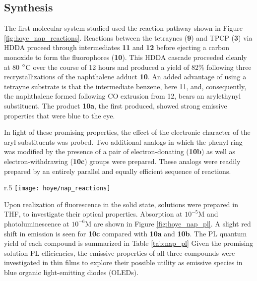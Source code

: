 \documentclass[../thesis.tex]{subfiles}
\begin{document}
\subsection{Synthesis}

The first molecular system studied used the reaction pathway shown in Figure \ref{fig:hoye_nap_reactions}.
Reactions between the tetraynes (\textbf{9}) and TPCP (\textbf{3}) via HDDA proceed through intermediates \textbf{11} and \textbf{12} before ejecting a carbon monoxide to form the fluorophores (\textbf{10}).\supercite{Giguere2015,Cacioppa2016,Pozo2016,Fieser1965,Wittig1958}
This HDDA cascade proceeded cleanly at 80 $\degree$C over the course of 12 hours and produced a yield of 82\% following three recrystallizations of the naphthalene adduct \textbf{10}. 
An added advantage of using a tetrayne substrate is that the intermediate benzene, here 11, and, consequently, the naphthalene formed following CO extrusion from 12, bears an arylethynyl substituent. 
The product \textbf{10a}, the first produced, showed strong emissive properties that were blue to the eye. 


In light of these promising properties, the effect of the electronic character of the aryl substituents was probed. 
Two additional analogs in which the phenyl ring was modified by the presence of a pair of electron-donating (\textbf{10b}) as well as electron-withdrawing (\textbf{10c}) groups were prepared. 
These analogs were readily prepared by an entirely parallel and equally efficient sequence of reactions.


\begin{wrapfigure}{r}{.5\textwidth}
\centering
\texttt{[image: hoye/nap\_reactions]}
\caption{HDDA reactions between \textbf{9} and \textbf{3} proceed through \textbf{11} and \textbf{12}, resulting in the products (\textbf{10}).  Figure reproduced from \textcite{Xu2016}}
\label{fig:hoye_nap_reactions}
\end{wrapfigure}


Upon realization of fluorescence in the solid state, solutions were prepared in THF, to investigate their optical properties.
Absorption at $10^{-5}$M and photoluminescence at $10^{-6}$M are shown in Figure \ref{fig:hoye_nap_pl}.
A slight red shift in emission is seen for \textbf{10c} compared with \textbf{10a} and \textbf{10b}.
The PL quantum yield of each compound is summarized in Table \ref{tab:nap_pl}
Given the promising solution PL efficiencies, the emissive properties of all three compounds were investigated in thin films to explore their possible utility as emissive species in blue organic light-emitting diodes (OLEDs). 
\end{document}
